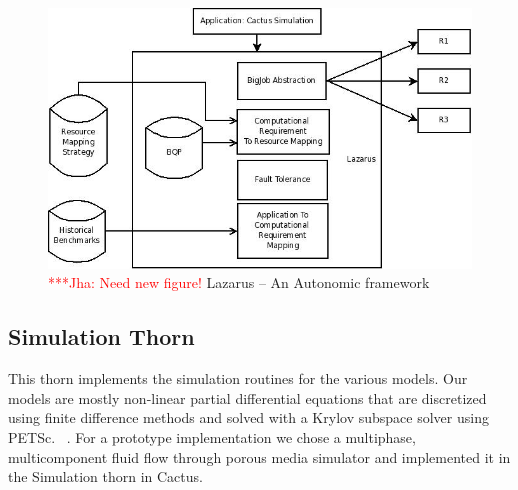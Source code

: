 \documentclass[conference,final]{IEEEtran}
\newcommand{\jhanote}[1]{ {\textcolor{red} { ***Jha: #1 }}}
\begin{document}
\begin{figure}
\begin{center}
\includegraphics[scale=0.34]{./figures/Lazarus_01.jpeg}
\end{center}
\caption{\jhanote{Need new figure!}  Lazarus -- An Autonomic
  framework}

\label{fig:application_architecture}
\end{figure}




\subsection{Simulation Thorn}

This thorn implements the simulation routines for the various models.
Our models are mostly non-linear partial differential equations that
are discretized using finite difference methods and solved with a
Krylov subspace solver using PETSc. ~\cite{PETSc}. For a prototype
implementation we chose a multiphase, multicomponent fluid flow
through porous media simulator and implemented it in the Simulation
thorn in Cactus.
\end{document}
